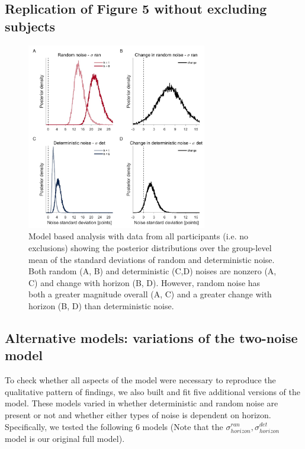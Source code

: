 \documentclass[12pt]{article}
\begin{document}
	\subsection{Replication of Figure 5 without excluding subjects}
	\begin{figure}[H]
		\begin{center}
			\includegraphics[width=0.7\textwidth]{figures/RDBayes_hyperprior__all.jpg}
			\caption{Model based analysis with data from all participants (i.e. no exclusions) showing the posterior distributions over the group-level mean of the standard deviations of  random and deterministic noise. Both random (A, B) and deterministic (C,D) noises are nonzero (A, C) and change with horizon (B, D).  However, random noise has both a greater magnitude overall (A, C) and a greater change with horizon (B, D) than deterministic noise.}
			\label{fig:s8}
		\end{center}
	\end{figure}
	\newpage
	\subsection{Alternative models: variations of the two-noise model}
	To check whether all aspects of the model were necessary to reproduce the qualitative pattern of findings, we also built and fit five additional versions of the model. These models varied in whether deterministic and random noise are present or not and whether either types of noise is dependent on horizon. Specifically, we tested the following 6 models (Note that the $\sigma^{ran}_{horizon},\sigma^{det}_{horizon}$ model is our original full model).
	
\end{document}
